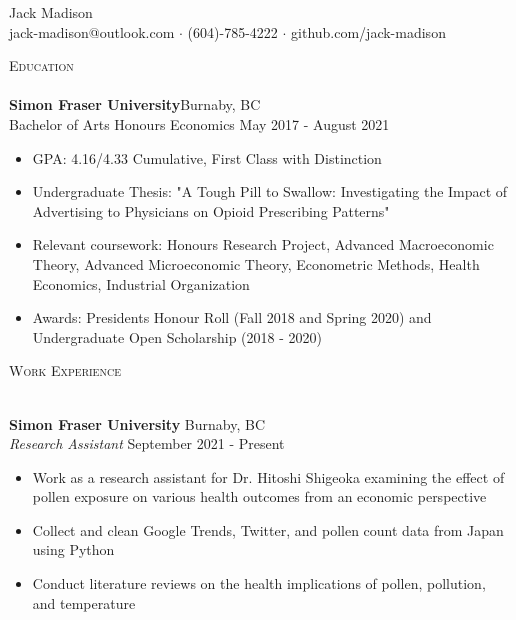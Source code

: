 \documentclass[]{article}
\newcommand{\lineunder} {
    \vspace*{-8pt} \\
    \hspace*{-18pt} \hrulefill \\
}
\newcommand{\header} [1] {
    {\hspace*{-18pt}\vspace*{6pt} \textsc{#1}}
    \vspace*{-6pt} \lineunder
}
\begin{document}
\vspace*{-40pt}

    

\vspace*{-10pt}
\begin{center}
	{\Huge {Jack Madison}}\\
	jack-madison@outlook.com $\cdot$ (604)-785-4222 $\cdot$ github.com/jack-madison\\
\end{center}

\header{Education}
\textbf{Simon Fraser University}\hfill Burnaby, BC\\
Bachelor of Arts Honours Economics \hfill May 2017 - August 2021\\
\begin{itemize}
    \item GPA: 4.16/4.33 Cumulative, First Class with Distinction
    \item Undergraduate Thesis: "A Tough Pill to Swallow: Investigating the Impact of Advertising to Physicians on Opioid Prescribing Patterns"
    \item Relevant coursework: Honours Research Project, Advanced Macroeconomic Theory, Advanced Microeconomic Theory, Econometric Methods, Health Economics, Industrial Organization
    \item Awards: Presidents Honour Roll (Fall 2018 and Spring 2020) and Undergraduate Open Scholarship (2018 - 2020)
\end{itemize}

\vspace{2mm}

\header{Work Experience}
\vspace{1mm}

\textbf{Simon Fraser University} \hfill Burnaby, BC\\
\textit{Research Assistant} \hfill September 2021 - Present\\
\begin{itemize}
    \item Work as a research assistant for Dr. Hitoshi Shigeoka examining the effect of pollen exposure on various health outcomes from an economic perspective
    \item Collect and clean Google Trends, Twitter, and pollen count data from Japan using Python 
    \item Conduct literature reviews on the health implications of pollen, pollution, and temperature
\end{itemize}
\end{document}
